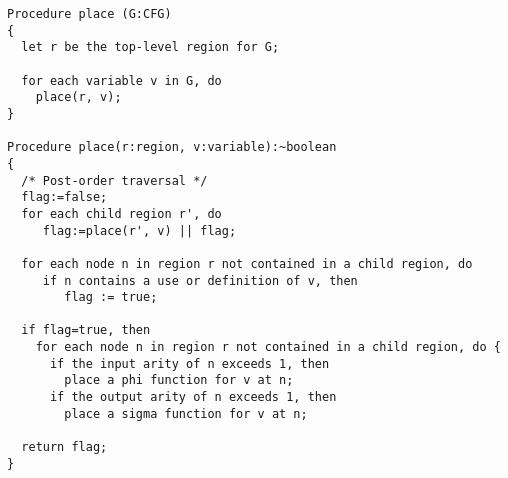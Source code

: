 \begin{verbatim}
Procedure place (G:CFG)
{
  let r be the top-level region for G;

  for each variable v in G, do
    place(r, v);
}

Procedure place(r:region, v:variable):~boolean
{
  /* Post-order traversal */
  flag:=false;
  for each child region r', do
     flag:=place(r', v) || flag;

  for each node n in region r not contained in a child region, do
     if n contains a use or definition of v, then
        flag := true;

  if flag=true, then
    for each node n in region r not contained in a child region, do {
      if the input arity of n exceeds 1, then
        place a phi function for v at n;
      if the output arity of n exceeds 1, then
        place a sigma function for v at n;

  return flag;
}
\end{verbatim}
